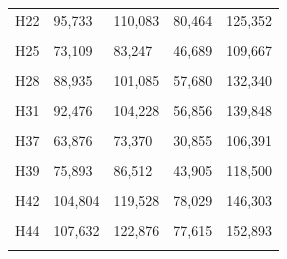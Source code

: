 \documentclass[
  a4paper,
  titlepage]{article}
\begin{document}
\begin{longtable}[t]{lllll}
H22 & 95,733 & 110,083 & 80,464 & 125,352\\
 
\cellcolor{gray!6}{H23} & \cellcolor{gray!6}{72,893} & \cellcolor{gray!6}{84,049} & \cellcolor{gray!6}{46,235} & \cellcolor{gray!6}{110,707}\\
 
H25 & 73,109 & 83,247 & 46,689 & 109,667\\
 
\cellcolor{gray!6}{H26} & \cellcolor{gray!6}{79,030} & \cellcolor{gray!6}{90,092} & \cellcolor{gray!6}{47,032} & \cellcolor{gray!6}{122,090}\\
 
H28 & 88,935 & 101,085 & 57,680 & 132,340\\
 
\cellcolor{gray!6}{H30} & \cellcolor{gray!6}{98,952} & \cellcolor{gray!6}{112,070} & \cellcolor{gray!6}{67,553} & \cellcolor{gray!6}{143,469}\\
 
H31 & 92,476 & 104,228 & 56,856 & 139,848\\
 
\cellcolor{gray!6}{H36} & \cellcolor{gray!6}{100,712} & \cellcolor{gray!6}{114,118} & \cellcolor{gray!6}{71,341} & \cellcolor{gray!6}{143,489}\\
 
H37 & 63,876 & 73,370 & 30,855 & 106,391\\
 
\cellcolor{gray!6}{H38} & \cellcolor{gray!6}{100,274} & \cellcolor{gray!6}{113,022} & \cellcolor{gray!6}{59,287} & \cellcolor{gray!6}{154,009}\\
 
H39 & 75,893 & 86,512 & 43,905 & 118,500\\
 
\cellcolor{gray!6}{H41} & \cellcolor{gray!6}{108,447} & \cellcolor{gray!6}{122,898} & \cellcolor{gray!6}{82,137} & \cellcolor{gray!6}{149,208}\\
 
H42 & 104,804 & 119,528 & 78,029 & 146,303\\
 
\cellcolor{gray!6}{H43} & \cellcolor{gray!6}{76,941} & \cellcolor{gray!6}{88,078} & \cellcolor{gray!6}{52,003} & \cellcolor{gray!6}{113,016}\\
 
H44 & 107,632 & 122,876 & 77,615 & 152,893\\
 
\cellcolor{gray!6}{H45} & \cellcolor{gray!6}{92,499} & \cellcolor{gray!6}{105,509} & \cellcolor{gray!6}{69,761} & \cellcolor{gray!6}{128,247}\\
 

\end{longtable}
\end{document}
